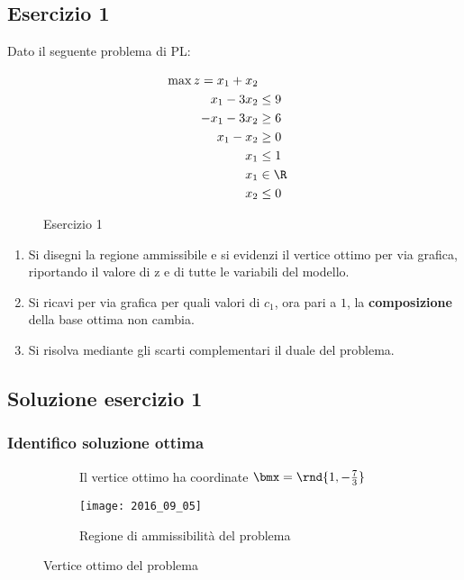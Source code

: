 \documentclass[\main/main.tex]{subfiles}
\begin{document}
\subsection{Esercizio 1}
Dato il seguente problema di PL:

\begin{figure}
  \begin{align*}
    \max z = x_1 + x_2   \\
    x_1 - 3x_2  & \leq 9 \\
    -x_1 - 3x_2 & \geq 6 \\
    x_1 - x_2   & \geq 0 \\
    x_1         & \leq 1 \\
    x_1         & \in \R \\
    x_2         & \leq 0
  \end{align*}
  \caption{Esercizio 1}
\end{figure}

\begin{enumerate}
  \item Si disegni la regione ammissibile e si evidenzi il vertice ottimo per via grafica, riportando il valore di z e di tutte le variabili del modello.
  \item Si ricavi per via grafica per quali valori di $c_1$, ora pari a $1$, la \textbf{composizione} della base ottima non cambia.
  \item Si risolva mediante gli scarti complementari il duale del problema.
\end{enumerate}

\subsection{Soluzione esercizio 1}

\subsubsection*{Identifico soluzione ottima}

\begin{figure}
  \begin{subfigure}{0.49\textwidth}
    \caption{Il vertice ottimo ha coordinate $\bmx = \rnd{1, -\frac{7}{3}}$}
  \end{subfigure}
  \begin{subfigure}{0.49\textwidth}
    \texttt{[image: 2016\_09\_05]}
    \caption{Regione di ammissibilità del problema}
  \end{subfigure}
  \caption{Vertice ottimo del problema}
\end{figure}
\end{document}

